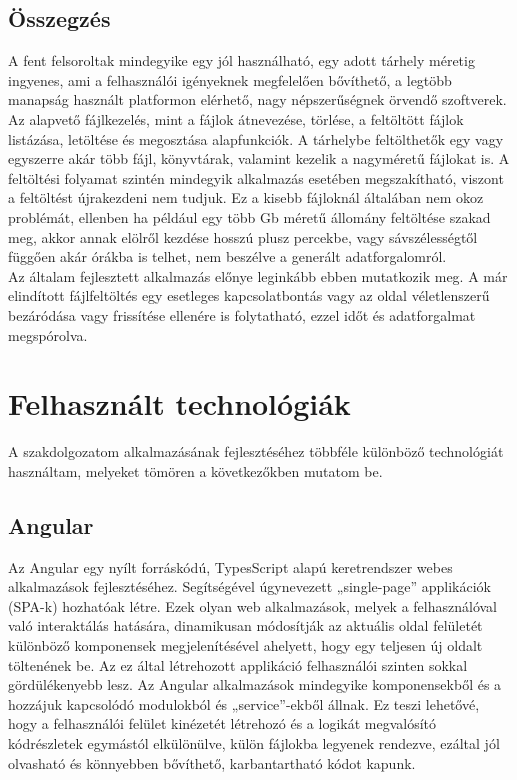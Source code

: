 \documentclass[12pt, twoside]{report}
\begin{document}
\section{Összegzés}
A fent felsoroltak mindegyike egy jól használható, egy adott tárhely méretig ingyenes, ami a felhasználói igényeknek megfelelően bővíthető, a legtöbb manapság használt platformon elérhető, nagy népszerűségnek örvendő szoftverek. Az alapvető fájlkezelés, mint a fájlok átnevezése, törlése, a feltöltött fájlok listázása, letöltése és megosztása alapfunkciók. A tárhelybe feltölthetők egy vagy egyszerre akár több fájl, könyvtárak, valamint kezelik a nagyméretű fájlokat is. A feltöltési folyamat szintén mindegyik alkalmazás esetében megszakítható, viszont a feltöltést újrakezdeni nem tudjuk. Ez a kisebb fájloknál általában nem okoz problémát, ellenben ha például egy több Gb méretű állomány feltöltése szakad meg, akkor annak elölről kezdése hosszú plusz percekbe, vagy sávszélességtől függően akár órákba is telhet, nem beszélve a generált adatforgalomról.\\
Az általam fejlesztett alkalmazás előnye leginkább ebben mutatkozik meg. A már elindított fájlfeltöltés egy esetleges kapcsolatbontás vagy az oldal véletlenszerű bezáródása vagy frissítése ellenére is folytatható, ezzel időt és adatforgalmat megspórolva.

\chapter{Felhasznált technológiák}
A szakdolgozatom alkalmazásának fejlesztéséhez többféle különböző technológiát használtam, melyeket tömören a következőkben mutatom be.

\section{Angular}
Az Angular egy nyílt forráskódú, TypesScript alapú keretrendszer webes alkalmazások fejlesztéséhez. Segítségével úgynevezett „single-page” applikációk (SPA-k) hozhatóak létre. Ezek olyan web alkalmazások, melyek a felhasználóval való interaktálás hatására, dinamikusan módosítják az aktuális oldal felületét különböző komponensek megjelenítésével ahelyett, hogy egy teljesen új oldalt töltenének be. Az ez által létrehozott applikáció felhasználói szinten sokkal gördülékenyebb lesz. Az Angular alkalmazások mindegyike komponensekből és a hozzájuk kapcsolódó modulokból és „service”-ekből állnak. Ez teszi lehetővé, hogy a felhasználói felület kinézetét létrehozó és a logikát megvalósító kódrészletek egymástól elkülönülve, külön fájlokba legyenek rendezve, ezáltal jól olvasható és könnyebben bővíthető, karbantartható kódot kapunk.
\end{document}
